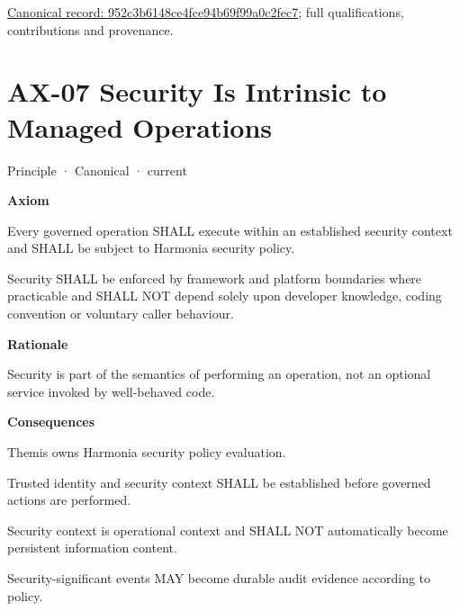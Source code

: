 {\footnotesize \href{../../../../continuum/motivation/principle/952c3b6148ce4fce94b69f99a0c2fec7.md}{Canonical record: 952c3b6148ce4fce94b69f99a0c2fec7}; full qualifications, contributions and provenance.}\par
\section{AX-07 Security Is Intrinsic to Managed Operations}

\label{element:5de2ae2c3b794c2d9f3a14efd51d564f}
{\small Principle · Canonical · current}\par

\par\medskip\textbf{Axiom}\par


Every governed operation SHALL execute within an established security
context and SHALL be subject to Harmonia security policy.



Security SHALL be enforced by framework and platform boundaries where
practicable and SHALL NOT depend solely upon developer knowledge, coding
convention or voluntary caller behaviour.



\par\medskip\textbf{Rationale}\par


Security is part of the semantics of performing an operation, not an
optional service invoked by well-behaved code.



\par\medskip\textbf{Consequences}\par


Themis owns Harmonia security policy evaluation.



Trusted identity and security context SHALL be established before
governed actions are performed.



Security context is operational context and SHALL NOT automatically
become persistent information content.



Security-significant events MAY become durable audit evidence according
to policy.







